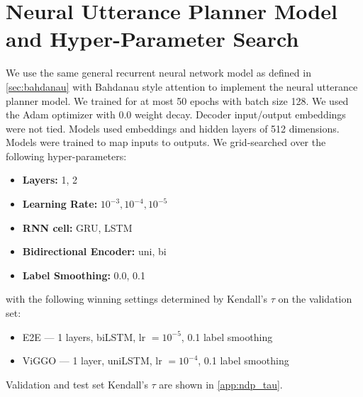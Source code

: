 \section{Neural Utterance Planner Model and Hyper-Parameter Search}
\label{app:ndp}



We use the same general recurrent neural network 
model as defined in \autoref{sec:bahdanau} with Bahdanau style attention
\cite{bahdanau2015}
to implement the neural utterance planner model. 
We trained for at most 50 epochs
with batch size 128. We used the Adam optimizer with 0.0 weight decay. Decoder input/output 
embeddings
were not tied.
Models used embeddings and hidden layers of 512 dimensions.
Models were trained to map  inputs to  outputs.
We grid-searched over the following hyper-parameters:
\begin{itemize}
    \item \textbf{Layers:} 1, 2 
    \item \textbf{Learning Rate:} $10^{-3}, 10^{-4}, 10^{-5}$ 
    \item \textbf{RNN cell:} GRU, LSTM
    \item \textbf{Bidirectional Encoder:} uni, bi
    \item \textbf{Label Smoothing:} 0.0, 0.1
\end{itemize}
with the following winning settings determined by Kendall's $\tau$
on the validation set:

\begin{itemize}
    \item E2E --- 1 layers, biLSTM, lr $=10^{-5}$, 0.1 label smoothing
    \item ViGGO --- 1 layer, uniLSTM, lr $=10^{-4}$, 0.1 label smoothing
\end{itemize}


Validation and test set Kendall's $\tau$ are shown in \autoref{app:ndp_tau}.

%
